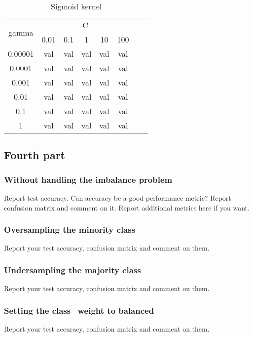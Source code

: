\documentclass{article}
\begin{document}
\begin{table}[h]
    \centering
    \begin{tabular}{|c|c|c|c|c|c|c|c|}
    \hline
    \multirow{2}{5em}{gamma} & \multicolumn{5}{c|}{C} \\
        & 0.01 & 0.1 & 1 & 10 & 100 \\
        \hline \hline
        0.00001  & val & val & val & val & val \\
        0.0001  & val & val & val & val & val \\
        0.001  & val & val & val & val & val \\
        0.01  & val & val & val & val & val \\
        0.1  & val & val & val & val & val \\
        1  & val & val & val & val & val \\
        \hline
    \end{tabular}
    \caption{Sigmoid kernel}
    \label{tab:sigmoid}
\end{table}

\newpage
\subsection{Fourth part}
\subsubsection{Without handling the imbalance problem}
Report test accuracy. Can accuracy be a good performance metric?
Report confusion matrix and comment on it. Report additional metrics here if you want.

\subsubsection{Oversampling the minority class}
Report your test accuracy, confusion matrix and comment on them.

\subsubsection{Undersampling the majority class}
Report your test accuracy, confusion matrix and comment on them.

\subsubsection{Setting the class\_weight to balanced}
Report your test accuracy, confusion matrix and comment on them.
\end{document}

